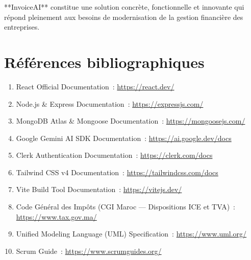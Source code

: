 \documentclass[a4paper,12pt]{extarticle}
\begin{document}
**InvoiceAI** constitue une solution concrète, fonctionnelle et innovante qui répond pleinement aux besoins de modernisation de la gestion financière des entreprises.

\newpage
\section*{Références bibliographiques}

\begin{enumerate}
  \item React Official Documentation~: \url{https://react.dev/}
  \item Node.js \& Express Documentation~: \url{https://expressjs.com/}
  \item MongoDB Atlas \& Mongoose Documentation~: \url{https://mongoosejs.com/}
  \item Google Gemini AI SDK Documentation~: \url{https://ai.google.dev/docs}
  \item Clerk Authentication Documentation~: \url{https://clerk.com/docs}
  \item Tailwind CSS v4 Documentation~: \url{https://tailwindcss.com/docs}
  \item Vite Build Tool Documentation~: \url{https://vitejs.dev/}
  \item Code Général des Impôts (CGI Maroc — Dispositions ICE et TVA)~: \url{https://www.tax.gov.ma/}
  \item Unified Modeling Language (UML) Specification~: \url{https://www.uml.org/}
  \item Scrum Guide~: \url{https://www.scrumguides.org/}
\end{enumerate}
\end{document}
